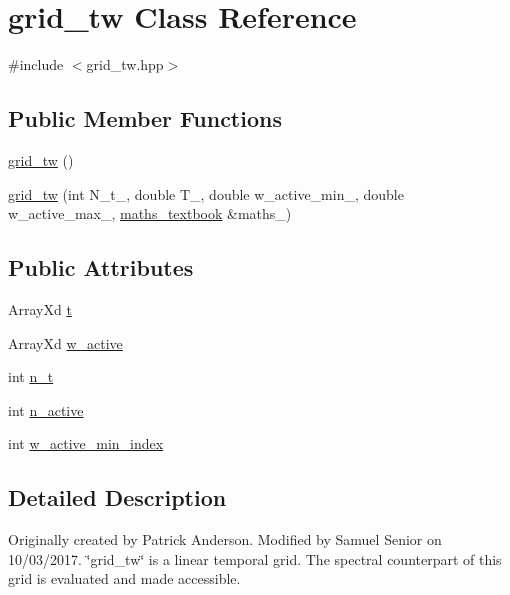 \hypertarget{classgrid__tw}{}\section{grid\+\_\+tw Class Reference}
\label{classgrid__tw}


{\ttfamily \#include $<$grid\+\_\+tw.\+hpp$>$}

\subsection*{Public Member Functions}
\begin{DoxyCompactItemize}
\item 
\mbox{\hyperlink{classgrid__tw_af1e2316561c84a2262e374600895010d}{grid\+\_\+tw}} ()
\item 
\mbox{\hyperlink{classgrid__tw_a583d4c2b423305ef3806d6221ed3f543}{grid\+\_\+tw}} (int N\+\_\+t\+\_\+, double T\+\_\+, double w\+\_\+active\+\_\+min\+\_\+, double w\+\_\+active\+\_\+max\+\_\+, \mbox{\hyperlink{classmaths__textbook}{maths\+\_\+textbook}} \&maths\+\_\+)
\end{DoxyCompactItemize}
\subsection*{Public Attributes}
\begin{DoxyCompactItemize}
\item 
Array\+Xd \mbox{\hyperlink{classgrid__tw_a918f1e6d18056d0f6da08fe01089b9b0}{t}}
\item 
Array\+Xd \mbox{\hyperlink{classgrid__tw_a66922766c9dfe5c4667e55e678b134b9}{w\+\_\+active}}
\item 
int \mbox{\hyperlink{classgrid__tw_ac121ce740479f628bdaa54627540ad42}{n\+\_\+t}}
\item 
int \mbox{\hyperlink{classgrid__tw_a1fbf854a0f7bd025aa98671009602c5c}{n\+\_\+active}}
\item 
int \mbox{\hyperlink{classgrid__tw_a27d987fb3c8cbacf9cd152b83477f0d9}{w\+\_\+active\+\_\+min\+\_\+index}}
\end{DoxyCompactItemize}


\subsection{Detailed Description}
Originally created by Patrick Anderson. Modified by Samuel Senior on 10/03/2017. \char`\"{}grid\+\_\+tw\char`\"{} is a linear temporal grid. The spectral counterpart of this grid is evaluated and made accessible. 

